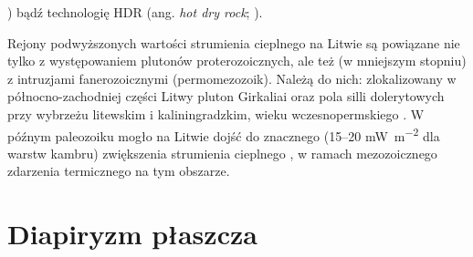 \documentclass[11.5pt,twoside]{report}
\newcommand{\ct}[1]{\ignorespaces} %
\begin{document}
\cite{Sliaupa.2012,Zinevicius.2010}) bąd\'{z} technologię HDR (ang. \textit{hot dry rock}; \cite{Sliaupa.2010}). 

Rejony podwyższonych wartości strumienia cieplnego na Litwie są powiązane nie tylko z występowaniem plutonów proterozoicznych, ale też (w mniejszym stopniu) z intruzjami fanerozoicznymi (permomezozoik). Należą do nich: zlokalizowany w północno-zachodniej części Litwy pluton Girkaliai oraz pola silli dolerytowych przy wybrzeżu litewskim i kaliningradzkim, wieku wczesnopermskiego \parencite{Motuza.2015}. W pó\'{z}nym paleozoiku mogło na Litwie dojść do znacznego (15--20 \si{\milli\watt\per\meter\squared} dla warstw kambru) zwiększenia strumienia cieplnego \parencite{Sliaupa.2006,Puura.2003}, w ramach mezozoicznego zdarzenia termicznego \parencite{Katinas.2004} na tym obszarze. 

\ct{spr Motuza et al., 2004}
\ct{kompleks mazurski - strumień cieplny?}

	\section{Diapiryzm płaszcza}

\end{document}
